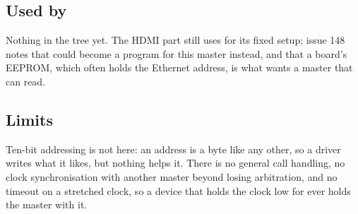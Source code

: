 \subsection*{Used by}

Nothing in the tree yet. The HDMI part still uses  for
its fixed setup; issue 148 notes that  could become a
program for this master instead, and that a board's EEPROM, which
often holds the Ethernet address, is what wants a master that can
read.

\subsection*{Limits}

Ten-bit addressing is not here: an address is a byte like any other,
so a driver writes what it likes, but nothing helps it. There is no
general call handling, no clock synchronisation with another master
beyond losing arbitration, and no timeout on a stretched clock, so a
device that holds the clock low for ever holds the master with it.
